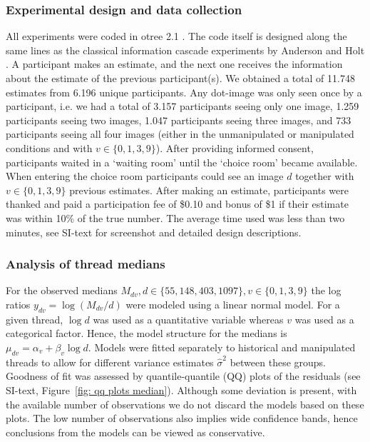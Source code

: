 \documentclass[9pt,a4paper,twocolumn,lineno]{article}
\begin{document}
\subsubsection*{Experimental design and data collection} 
All experiments were coded in otree 2.1 \cite{chen2016otree}. The code itself is designed along the same lines as the classical information cascade experiments by Anderson and Holt \cite{anderson1997information}. A participant makes an estimate, and the next one receives the information about the estimate of the previous participant(s). %
We obtained a total of 11.748 estimates from 6.196 unique participants. Any dot-image was only seen once by a participant, i.e. we had a total of 3.157 participants seeing only one image, 1.259 participants seeing two images, 1.047 participants seeing three images, and 733 participants seeing all four images (either in the unmanipulated or manipulated conditions and with $v \in \{0, 1, 3, 9\}$). After providing informed consent, participants waited in a ‘waiting room’ until the ‘choice room’ became available. When entering the choice room participants could see an image $d$ together with $v \in \{0,1,3,9\}$ previous estimates. After making an estimate, participants were thanked and paid a participation fee of \$0.10 and bonus of \$1 if their estimate was within 10\% of the true number. The average time used was less than two minutes, see SI-text for screenshot and detailed design descriptions.

\subsubsection*{Analysis of thread medians} For the observed medians $M_{dv}, d\in \{55,148,403,1097\}, v \in \{0,1,3,9\}$ the log ratios $y_{dv} = \log (M_{dv}/d)$ were modeled using a linear normal model. For a given thread, $\log{d}$ was used as a quantitative variable whereas $v$ was used as a categorical factor. Hence, the model structure for the medians is $\mu_{dv} = \alpha_v+\beta_v\log{d}$. Models were fitted separately to historical and manipulated threads to allow for different variance estimates $\hat{\sigma}^2$ between these groups. Goodness of fit was assessed by quantile-quantile (QQ) plots of the residuals (see SI-text, Figure~\ref{fig: qq plots median}). Although some deviation is present, with the available number of observations we do not discard the models based on these plots. The low number of observations also implies wide confidence bands, hence conclusions from the models can be viewed as conservative. 
\end{document}

